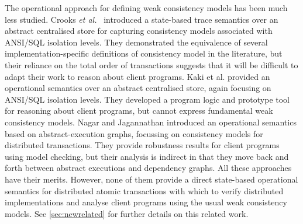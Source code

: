 The operational approach for defining weak consistency models has been
much less studied.  Crooks {\em et al.}~\citet{seebelieve} introduced
a {state-based} trace semantics over an abstract centralised store for
capturing consistency models associated with ANSI/SQL isolation
levels.  They demonstrated the equivalence of several
implementation-specific definitions of consistency model in the
literature, but their reliance on the total order of transactions
suggests that it will be difficult to adapt their work to reason about
client programs.  Kaki et al. \citet{alonetogether} provided an
operational semantics over an abstract centralised store, again
focusing on ANSI/SQL isolation levels. They developed a program logic
and prototype tool for reasoning about client programs, but cannot
express fundamental weak consistency models.  Nagar and Jagannathan
\cite{sureshConcur} introduced an operational semantics based on
abstract-execution graphs, focussing on consistency models for
distributed transactions. They provide robustness results for client
programs using model checking, but their analysis is indirect in that
they move back and forth between abstract executions and dependency
graphs. All these approaches have their merits. However, none of them
provide a direct state-based operational semantics for distributed
atomic transactions with which to verify distributed implementations
and analyse client programs using the usual weak consistency models.
See \cref{sec:newrelated} for further details on this related work. 



